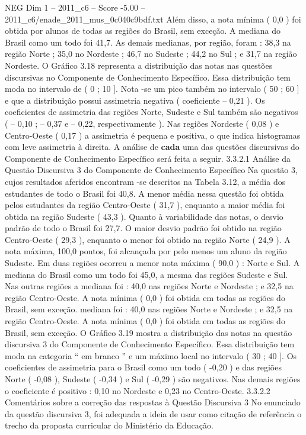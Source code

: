 \begin{textsample}{NEG Dim 1 – 2011\_c6 – Score -5.00 – 2011\_c6/enade\_2011\_mus\_0c040c9bdf.txt}
Além disso, a nota mínima ( 0,0 ) foi obtida por alunos de todas as regiões do Brasil, sem exceção.
A mediana do Brasil como um todo foi 41,7.
As demais medianas, por região, foram : 38,3 na região Norte ; 35,0 no Nordeste ; 46,7 no Sudeste ; 44,2 no Sul ; e 31,7 na região Nordeste.
O Gráfico 3.18 representa a distribuição das notas nas questões discursivas no Componente de Conhecimento Específico.
Essa distribuição tem moda no intervalo de ( 0 ; 10 ].
Nota -se um pico também no intervalo ( 50 ; 60 ] e que a distribuição possui assimetria negativa ( coeficiente – 0,21 ).
Os coeficientes de assimetria das regiões Norte, Sudeste e Sul também são negativos ( – 0,10 ; – 0,37 e – 0,22, respectivamente ).
Nas regiões Nordeste ( 0,08 ) e Centro-Oeste ( 0,17 ) a assimetria é pequena e positiva, o que indica histogramas com leve assimetria à direita.
A análise de \textbf{cada} uma das questões discursivas do Componente de Conhecimento Específico será feita a seguir. 3.3.2.1 Análise da Questão Discursiva 3 do Componente de Conhecimento Específico Na questão 3, cujos resultados aferidos encontram -se descritos na Tabela 3.12, a média dos estudantes de todo o Brasil foi 40,8.
A menor média nessa questão foi obtida pelos estudantes da região Centro-Oeste ( 31,7 ), enquanto a maior média foi obtida na região Sudeste ( 43,3 ).
Quanto à variabilidade das notas, o desvio padrão de todo o Brasil foi 27,7.
O maior desvio padrão foi obtido na região Centro-Oeste ( 29,3 ), enquanto o menor foi obtido na região Norte ( 24,9 ).
A nota máxima, 100,0 pontos, foi alcançada por pelo menos um aluno da região Sudeste.
Em duas regiões ocorreu a menor nota máxima ( 90,0 ) : Norte e Sul.
A mediana do Brasil como um todo foi 45,0, a mesma das regiões Sudeste e Sul.
Nas outras regiões a mediana foi : 40,0 nas regiões Norte e Nordeste ; e 32,5 na região Centro-Oeste.
A nota mínima ( 0,0 ) foi obtida em todas as regiões do Brasil, sem exceção. mediana foi : 40,0 nas regiões Norte e Nordeste ; e 32,5 na região Centro-Oeste.
A nota mínima ( 0,0 ) foi obtida em todas as regiões do Brasil, sem exceção.
O Gráfico 3.19 mostra a distribuição das notas na questão discursiva 3 do Componente de Conhecimento Específico.
Essa distribuição tem moda na categoria “ em branco ” e um máximo local no intervalo ( 30 ; 40 ].
Os coeficientes de assimetria para o Brasil como um todo ( -0,20 ) e das regiões Norte ( -0,08 ), Sudeste ( -0,34 ) e Sul ( -0,29 ) são negativos.
Nas demais regiões o coeficiente é positivo : 0,10 no Nordeste e 0,23 no Centro-Oeste. 3.3.2.2 Comentários sobre a correção das respostas à Questão Discursiva 3 No enunciado da questão discursiva 3, foi adequada a ideia de usar como citação de referência o trecho da proposta curricular do Ministério da Educação.

\end{textsample}
